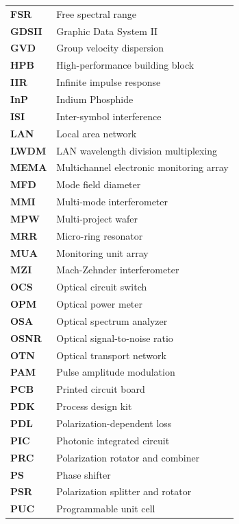 \begin{longtable}{@{}p{} p{}@{}}
    \textbf{FSR}  & Free spectral range \\
    \textbf{GDSII}  & Graphic Data System II \\
    \textbf{GVD}  & Group velocity dispersion  \\
    \textbf{HPB}  & High-performance building block  \\
    \textbf{IIR}  & Infinite impulse response  \\
    \textbf{InP}  & Indium Phosphide  \\
    \textbf{ISI}  & Inter-symbol interference  \\
    \textbf{LAN}  & Local area network \\
    \textbf{LWDM}  & LAN wavelength division multiplexing \\
    \textbf{MEMA}  & Multichannel electronic monitoring array \\
    \textbf{MFD}  & Mode field diameter \\
    \textbf{MMI}  & Multi-mode interferometer \\
    \textbf{MPW}  & Multi-project wafer \\
    \textbf{MRR}  & Micro-ring resonator \\
    \textbf{MUA}  & Monitoring unit array \\
    \textbf{MZI}  & Mach-Zehnder interferometer \\
    \textbf{OCS}  & Optical circuit switch \\
    \textbf{OPM}  & Optical power meter \\
    \textbf{OSA}  & Optical spectrum analyzer \\
    \textbf{OSNR}  & Optical signal-to-noise ratio \\
    \textbf{OTN}  & Optical transport network \\
    \textbf{PAM}  & Pulse amplitude modulation  \\
    \textbf{PCB}  & Printed circuit board  \\
    \textbf{PDK}  & Process design kit \\
    \textbf{PDL}  & Polarization-dependent loss \\
    \textbf{PIC}  & Photonic integrated circuit \\
    \textbf{PRC}  & Polarization rotator and combiner  \\
    \textbf{PS}  & Phase shifter  \\
    \textbf{PSR}  & Polarization splitter and rotator  \\
    \textbf{PUC}  & Programmable unit cell \\

\end{longtable}
